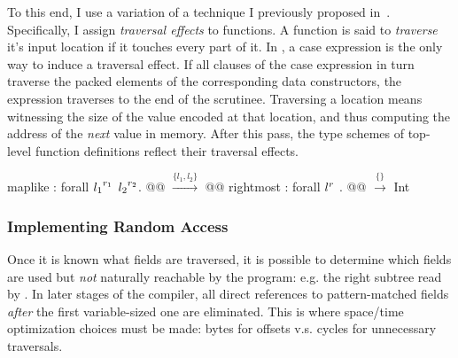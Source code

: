 To this end, I use a variation of a technique I previously proposed
in~\cite{ecoop17-gibbon}. Specifically, I assign \emph{traversal effects} to
functions. A function is said to \emph{traverse} it's input location if it
touches every part of it. In \ourcalc{}, a case expression is the only way to
induce a traversal effect. If all clauses of the case expression in turn
traverse the packed elements of the corresponding data constructors, the
expression traverses to the end of the scrutinee.
%
Traversing a location means witnessing the size of the value encoded at that
location, and thus computing the address of the \emph{next} value in memory.
%
After this pass, the type schemes of top-level function definitions reflect
their traversal effects.


\begin{code}
maplike : forall ${l_1}^{r_1}$ ${l_2}^{r_2}$. @@ $\xrightarrow{\{ l_1, l_2 \}}$ @@
rightmost : forall ${l}^{r}$ . @@ $\xrightarrow{\{\}}$ Int
\end{code}

\subsubsection{Implementing Random Access}
\label{sec:rand-access}

Once it is known what fields are traversed, it is possible to determine which fields are
used but \emph{not} naturally reachable by the program: e.g. the right subtree
read by .
%
In later stages of the compiler, all direct references to
pattern-matched fields {\em after} the first variable-sized one are eliminated.
%
This is where space/time optimization choices must be made:
bytes for offsets v.s. cycles for unnecessary traversals.

